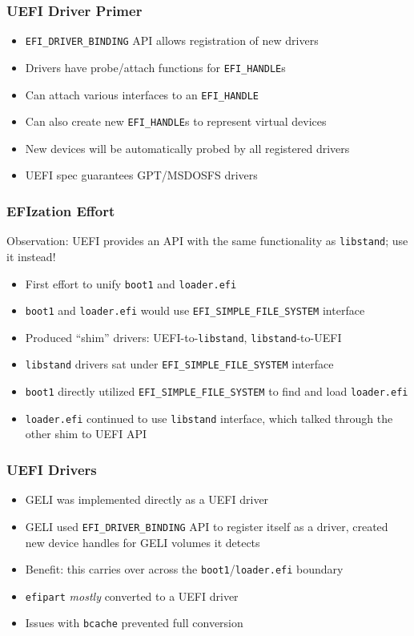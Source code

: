 \documentclass{beamer}
\begin{document}
\begin{frame}
  \frametitle{UEFI Driver Primer}
  \begin{itemize}
  \item \texttt{EFI\_DRIVER\_BINDING} API allows registration of new drivers
  \item Drivers have probe/attach functions for \texttt{EFI\_HANDLE}s
  \item Can attach various interfaces to an \texttt{EFI\_HANDLE}
  \item Can also create new \texttt{EFI\_HANDLE}s to represent virtual devices
  \item New devices will be automatically probed by all registered drivers
  \item UEFI spec guarantees GPT/MSDOSFS drivers
  \end{itemize}
\end{frame}

\begin{frame}
  \frametitle{EFIzation Effort}
  Observation: UEFI provides an API with the same functionality as
  \texttt{libstand}; use it instead!
  \begin{itemize}
  \item First effort to unify \texttt{boot1} and \texttt{loader.efi}
  \item \texttt{boot1} and \texttt{loader.efi} would use
    \texttt{EFI\_SIMPLE\_FILE\_SYSTEM} interface
  \item Produced ``shim'' drivers: UEFI-to-\texttt{libstand},
    \texttt{libstand}-to-UEFI
  \item \texttt{libstand} drivers sat under
    \texttt{EFI\_SIMPLE\_FILE\_SYSTEM} interface
  \item \texttt{boot1} directly utilized
    \texttt{EFI\_SIMPLE\_FILE\_SYSTEM} to find and load \texttt{loader.efi}
  \item \texttt{loader.efi} continued to use \texttt{libstand}
    interface, which talked through the other shim to UEFI API
  \end{itemize}
\end{frame}

\begin{frame}
  \frametitle{UEFI Drivers}
  \begin{itemize}
  \item GELI was implemented directly as a UEFI driver
  \item GELI used \texttt{EFI\_DRIVER\_BINDING} API to register itself
    as a driver, created new device handles for GELI volumes it detects
  \item Benefit: this carries over across the
    \texttt{boot1}/\texttt{loader.efi} boundary
  \item \texttt{efipart} \emph{mostly} converted to a UEFI driver
  \item Issues with \texttt{bcache} prevented full conversion
  \end{itemize}
\end{frame}
\end{document}
